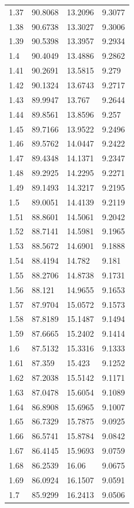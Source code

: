 \begin{tabular}{llll}
1.37 & 90.8068 & 13.2096 & 9.3077 \\
1.38 & 90.6738 & 13.3027 & 9.3006 \\
1.39 & 90.5398 & 13.3957 & 9.2934 \\
1.4 & 90.4049 & 13.4886 & 9.2862 \\
1.41 & 90.2691 & 13.5815 & 9.279 \\
1.42 & 90.1324 & 13.6743 & 9.2717 \\
1.43 & 89.9947 & 13.767 & 9.2644 \\
1.44 & 89.8561 & 13.8596 & 9.257 \\
1.45 & 89.7166 & 13.9522 & 9.2496 \\
1.46 & 89.5762 & 14.0447 & 9.2422 \\
1.47 & 89.4348 & 14.1371 & 9.2347 \\
1.48 & 89.2925 & 14.2295 & 9.2271 \\
1.49 & 89.1493 & 14.3217 & 9.2195 \\
1.5 & 89.0051 & 14.4139 & 9.2119 \\
1.51 & 88.8601 & 14.5061 & 9.2042 \\
1.52 & 88.7141 & 14.5981 & 9.1965 \\
1.53 & 88.5672 & 14.6901 & 9.1888 \\
1.54 & 88.4194 & 14.782 & 9.181 \\
1.55 & 88.2706 & 14.8738 & 9.1731 \\
1.56 & 88.121 & 14.9655 & 9.1653 \\
1.57 & 87.9704 & 15.0572 & 9.1573 \\
1.58 & 87.8189 & 15.1487 & 9.1494 \\
1.59 & 87.6665 & 15.2402 & 9.1414 \\
1.6 & 87.5132 & 15.3316 & 9.1333 \\
1.61 & 87.359 & 15.423 & 9.1252 \\
1.62 & 87.2038 & 15.5142 & 9.1171 \\
1.63 & 87.0478 & 15.6054 & 9.1089 \\
1.64 & 86.8908 & 15.6965 & 9.1007 \\
1.65 & 86.7329 & 15.7875 & 9.0925 \\
1.66 & 86.5741 & 15.8784 & 9.0842 \\
1.67 & 86.4145 & 15.9693 & 9.0759 \\
1.68 & 86.2539 & 16.06 & 9.0675 \\
1.69 & 86.0924 & 16.1507 & 9.0591 \\
1.7 & 85.9299 & 16.2413 & 9.0506 \\

\end{tabular}
